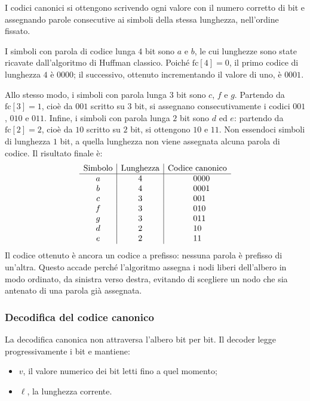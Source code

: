 \documentclass{article}
\theoremstyle{definition}
\newcommand{\lbox}[1]{\makebox[1em][l]{#1}} %
\numberwithin{equation}{section}
\begin{document}
\medskip

I codici canonici si ottengono scrivendo ogni valore con il numero corretto di bit e assegnando parole consecutive ai simboli della stessa lunghezza, nell'ordine fissato.

I simboli con parola di codice lunga $4$ bit sono $a$ e $b$, le cui lunghezze sono state ricavate dall'algoritmo di Huffman classico. Poiché $\text{fc}[4]=0$, il primo codice di lunghezza $4$ è $0000$; il successivo, ottenuto incrementando il valore di uno, è $0001$.

Allo stesso modo, i simboli con parola lunga $3$ bit sono $c$, $f$ e $g$. Partendo da $\text{fc}[3]=1$, cioè da $001$ scritto su $3$ bit, si assegnano consecutivamente i codici $001$, $010$ e $011$. Infine, i simboli con parola lunga $2$ bit sono $d$ ed $e$: partendo da $\text{fc}[2]=2$, cioè da $10$ scritto su $2$ bit, si ottengono $10$ e $11$. Non essendoci simboli di lunghezza $1$ bit, a quella lunghezza non viene assegnata alcuna parola di codice. Il risultato finale è:
\[
    \begin{array}{c|c|c}
        \text{Simbolo} & \text{Lunghezza} & \text{Codice canonico} \\
        \hline
        a              & 4                & \lbox{0000}            \\
        b              & 4                & \lbox{0001}            \\
        c              & 3                & \lbox{001}             \\
        f              & 3                & \lbox{010}             \\
        g              & 3                & \lbox{011}             \\
        d              & 2                & \lbox{10}              \\
        e              & 2                & \lbox{11}
    \end{array}
\]
Il codice ottenuto è ancora un codice a prefisso: nessuna parola è prefisso di un'altra. Questo accade perché l'algoritmo assegna i nodi liberi dell'albero in modo ordinato, da sinistra verso destra, evitando di scegliere un nodo che sia antenato di una parola già assegnata.

\subsubsection{Decodifica del codice canonico}
La decodifica canonica non attraversa l'albero bit per bit. Il decoder legge progressivamente i bit e mantiene:
\begin{itemize}
    \item $v$, il valore numerico dei bit letti fino a quel momento;
    \item $\ell$, la lunghezza corrente.
\end{itemize}
\end{document}
